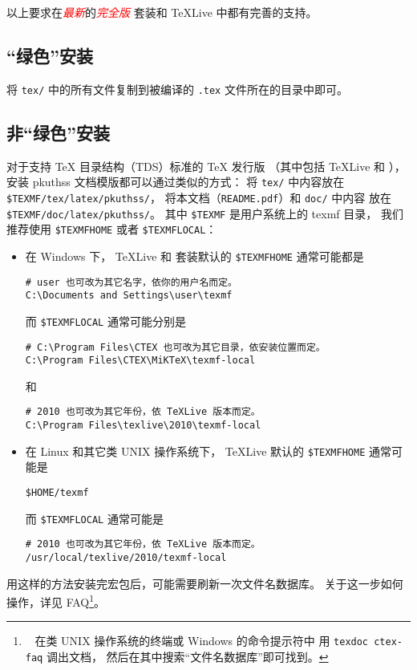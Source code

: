 \documentclass[UTF8, fancyhdr, hyperref]{ctexart}
\newcommand{\myemph}[1]{\emph{\textcolor{red}{#1}}}
\begin{document}
以上要求在\myemph{最新}的\myemph{完全版}
\CTeX{} 套装和 \TeX{}Live 中都有完善的支持。

\subsection{“绿色”安装}

将 \verb|tex/| 中的所有文件复制到被编译的 \verb|.tex| 文件所在的目录中即可。

\subsection{非“绿色”安装}

对于支持 \TeX{} 目录结构（TDS）标准的 \TeX{} 发行版%
（其中包括 \TeX{}Live 和 \CTeX{}），
安装 pkuthss 文档模版都可以通过类似的方式：
将 \verb|tex/| 中内容放在 \verb|$TEXMF/tex/latex/pkuthss/|，
将本文档（\verb|README.pdf|）和 \verb|doc/| 中内容%
放在 \verb|$TEXMF/doc/latex/pkuthss/|。
其中 \verb|$TEXMF| 是用户系统上的 texmf 目录，
我们推荐使用 \verb|$TEXMFHOME| 或者 \verb|$TEXMFLOCAL|：
\begin{itemize}
	\item 在 Windows 下，%
		\TeX{}Live 和 \CTeX{} 套装默认的 \verb|$TEXMFHOME| %
		通常可能都是
\begin{Verbatim}[frame = single]
# user 也可改为其它名字，依你的用户名而定。
C:\Documents and Settings\user\texmf
\end{Verbatim}
		而 \verb|$TEXMFLOCAL| 通常可能分别是
\begin{Verbatim}[frame = single]
# C:\Program Files\CTEX 也可改为其它目录，依安装位置而定。
C:\Program Files\CTEX\MiKTeX\texmf-local
\end{Verbatim}
		和
\begin{Verbatim}[frame = single]
# 2010 也可改为其它年份，依 TeXLive 版本而定。
C:\Program Files\texlive\2010\texmf-local
\end{Verbatim}
	\item 在 Linux 和其它类 UNIX 操作系统下，
		\TeX{}Live 默认的 \verb|$TEXMFHOME| 通常可能是
\begin{Verbatim}[frame = single]
$HOME/texmf
\end{Verbatim}
		而 \verb|$TEXMFLOCAL| 通常可能是
\begin{Verbatim}[frame = single]
# 2010 也可改为其它年份，依 TeXLive 版本而定。
/usr/local/texlive/2010/texmf-local
\end{Verbatim}
\end{itemize}

用这样的方法安装完宏包后，可能需要刷新一次文件名数据库。
关于这一步如何操作，详见 \CTeX{} FAQ\supercite{ctex-faq}\footnote{\ %
	在类 UNIX 操作系统的终端或 Windows 的命令提示符中%
	用 \texttt{texdoc ctex-faq} 调出文档，
	然后在其中搜索“文件名数据库”即可找到。%
}。
\end{document}
